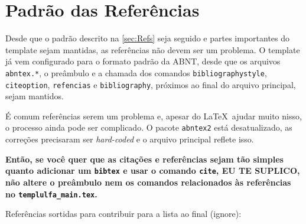\section{Padrão das Referências}

Desde que o padrão descrito na \autoref{sec:Refs} seja seguido e partes importantes do template sejam mantidas, as referências não devem ser um problema. O template já vem configurado para o formato padrão da ABNT, desde que os arquivos \texttt{abntex.*}, o preâmbulo e a chamada dos comandos \texttt{bibliographystyle}, \texttt{citeoption}, \texttt{refencias} e \texttt{bibliography}, próximos ao final do arquivo principal, sejam mantidos.

É comum referências serem um problema e, apesar do \LaTeX\ ajudar muito nisso, o processo ainda pode ser complicado. O pacote \texttt{abntex2} está desatualizado, as correções precisaram ser \emph{hard-coded} e o arquivo principal reflete isso.

\textbf{Então, se você quer que as citações e referências sejam tão simples quanto adicionar um \texttt{bibtex} e usar o comando \texttt{cite}, EU TE SUPLICO, não altere o preâmbulo nem os comandos relacionados às referências no \texttt{templulfa\_main.tex}.}

Referências sortidas para contribuir para a lista ao final (ignore): \cite{Eco1996,Booth2000,BIB2010,Hexsel2004,Franca2001,Gil2002,Porto2002,Silva2005,UFLA:2015,Moura1998,NBR6023:2002,LeGuin:1987}

